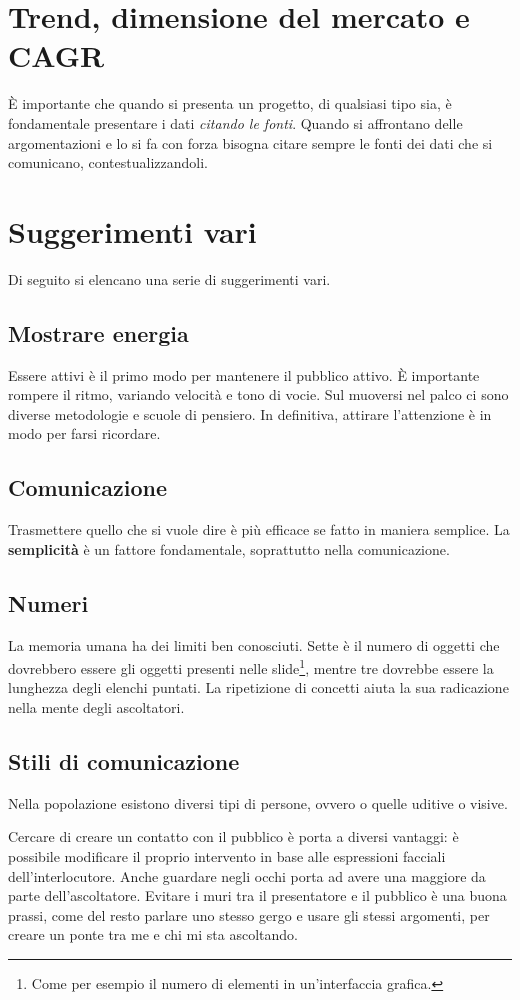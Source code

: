 
\section{Trend, dimensione del mercato e CAGR}

È importante che quando si presenta un progetto, di qualsiasi tipo sia, è
fondamentale presentare i dati \textit{citando le fonti}.
Quando si affrontano delle argomentazioni e lo si fa con forza bisogna citare
sempre le fonti dei dati che si comunicano, contestualizzandoli.

\section{Suggerimenti vari}

Di seguito si elencano una serie di suggerimenti vari.

\subsection{Mostrare energia}

Essere attivi è il primo modo per mantenere il pubblico attivo. È importante
rompere il ritmo, variando velocità e tono di vocie. Sul muoversi nel palco ci
sono diverse metodologie e scuole di pensiero. In definitiva, attirare
l'attenzione è in modo per farsi ricordare.

\subsection{Comunicazione}

Trasmettere quello che si vuole dire è più efficace se fatto in maniera
semplice. La \textbf{semplicità} è un fattore fondamentale, soprattutto nella
comunicazione.

\subsection{Numeri}

La memoria umana ha dei limiti ben conosciuti. Sette è il numero di oggetti che
dovrebbero essere gli oggetti presenti nelle slide\footnote{Come per esempio
il numero di elementi in un'interfaccia grafica.}, mentre tre dovrebbe essere
la lunghezza degli elenchi puntati. La ripetizione di concetti aiuta la sua
radicazione nella mente degli ascoltatori.

\subsection{Stili di comunicazione}

Nella popolazione esistono diversi tipi di persone, ovvero o quelle uditive o
visive.

Cercare di creare un contatto con il pubblico è porta a diversi vantaggi: è
possibile modificare il proprio intervento in base alle espressioni facciali
dell'interlocutore. Anche guardare negli occhi porta ad avere una maggiore da
parte dell'ascoltatore. Evitare i muri tra il presentatore e il pubblico è una
buona prassi, come del resto parlare uno stesso gergo e usare gli stessi
argomenti, per creare un ponte tra me e chi mi sta ascoltando.
